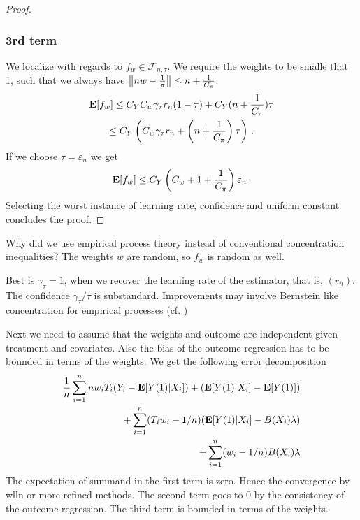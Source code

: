 \begin{proof}
\subsubsection*{3rd term}
We localize with regards to 
$
f_w \in \mathcal{F}_{n,\tau}
.
$
We require the weights to be smalle that 1, such that 
we always have
$
\left\lVert nw-  \frac{1}{\pi}\right\rVert
\le
n + \frac{1}{C_\pi}
$.
\begin{gather}
  \mathbf{E}[f_w]
  \le
  C_Y 
  C_w
  \gamma_\tau
  r_n
  (1-\tau)
  +
  C_Y
  (
n + \frac{1}{C_\pi}
  )
  \tau
  \\
  \le
  C_Y
  \left( 
  C_w
  \gamma_\tau
  r_n
  +
  \left(
n + \frac{1}{C_\pi}
  \right)
  \tau
  \right)
  \,.
\end{gather}
If we choose  $\tau=\varepsilon_n$
we get
\begin{gather}
  \mathbf{E}[f_w]
  \le
  C_Y
  \left( 
C_w+1+ \frac{1}{C_\pi}
  \right)
  \varepsilon_n
  \,.
\end{gather}
Selecting the worst instance of learning rate, confidence and uniform constant concludes the proof.

\end{proof}

\begin{reflection*}
  Why did we use empirical process theory instead of conventional concentration inequalities?
  The weights $w$ are random, so $f_w$ is random as well. 


Best is $\gamma_\tau=1$, when we recover the learning rate of the estimator, that is, $(r_n)$.
The confidence $\gamma_\tau/\tau$ is substandard. Improvements may involve Bernstein like concentration for empirical processes (cf. \cite[Section~2.14.2]{vaart2013})
\end{reflection*}

Next we need to assume that the weights and outcome are independent given treatment and covariates.
Also the bias of the outcome regression has to be bounded in terms of the weights. We get the following error decomposition
\begin{align}
  \frac{1}{n}
  \sum_{i=1}^{n}
  nw_i T_i (Y_i - \mathbf{E}[Y(1)|X_i])
  +
  (\mathbf{E}[Y(1)|X_i]-\mathbf{E}[Y(1)])
  \\
  +
  \sum_{i=1}^{n} 
  (T_i w_i-1/n)
  (
  \mathbf{E}[Y(1)|X_i]
  -
  B(X_i)\lambda
  )
  \\
  +
  \sum_{i=1}^{n} 
  (w_i-1/n)
  B(X_i)\lambda
\end{align}
The expectation of summand in the first term is zero. Hence the convergence by wlln or more refined methods.
The second term goes to 0 by the consistency of the outcome regression.
The third term is bounded in terms of the weights.

